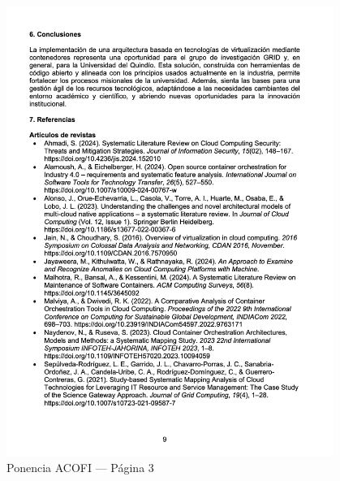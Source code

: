 \begin{figure}[H]
	\centering
	\begin{tcolorbox}[
			colback=white,
			colframe=gray!50,
			boxrule=1pt,
			arc=2pt,
			boxsep=5pt,
			left=3pt,
			right=3pt,
			top=3pt,
			bottom=3pt,
			drop shadow
		]
		\includegraphics[width=0.95\textwidth,keepaspectratio]{apendices/ACOFI/pagina_3.png}
	\end{tcolorbox}
	\caption{Ponencia ACOFI --- Página 3}\label{fig:acofi-pagina-3}
\end{figure}
\FloatBarrier%
